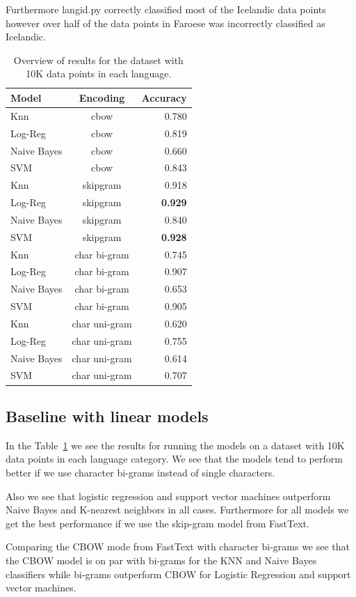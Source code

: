 Furthermore langid.py correctly classified most of the Icelandic data points however over half of the data points in Faroese was incorrectly classified as Icelandic.

\begin{table}
  \centering
  \begin{tabular}{ l | c | r }
    \hline
    Model               & Encoding  & Accuracy \\
    \hline
    Knn                 & cbow &  0.780\\
    Log-Reg             & cbow &  0.819\\
    Naive Bayes         & cbow &  0.660\\
    SVM                 & cbow &  0.843\\
    Knn                 & skipgram &  0.918\\
    Log-Reg             & skipgram &  \textbf{0.929}\\
    Naive Bayes         & skipgram &  0.840\\
    SVM                 & skipgram &  \textbf{0.928}\\
    Knn                 & char bi-gram  & 0.745\\
    Log-Reg             & char bi-gram  & 0.907\\
    Naive Bayes         & char bi-gram  & 0.653\\
    SVM                 & char bi-gram  & 0.905\\
    Knn                 & char uni-gram  & 0.620\\
    Log-Reg             & char uni-gram  & 0.755\\
    Naive Bayes         & char uni-gram  & 0.614\\
    SVM                 & char uni-gram  & 0.707\\
    \hline
  \end{tabular}
  \caption{Overview of results for the dataset with 10K data points in each language.}
  \label{baseline-results-10k}
\end{table}

\subsection{Baseline with linear models}

In the Table~\ref{baseline-results-10k} we see the results for running the models on a dataset with 10K data points in each language category. We see that the models tend to perform better if we use character bi-grams instead of single characters.

Also we see that logistic regression and support vector machines outperform Naive Bayes and K-nearest neighbors in all cases. Furthermore for all models we get the best performance if we use the skip-gram model from FastText.

Comparing the CBOW mode from FastText with character bi-grams we see that the CBOW model is on par with bi-grams for the KNN and Naive Bayes classifiers while bi-grams outperform  CBOW for Logistic Regression and support vector machines.

